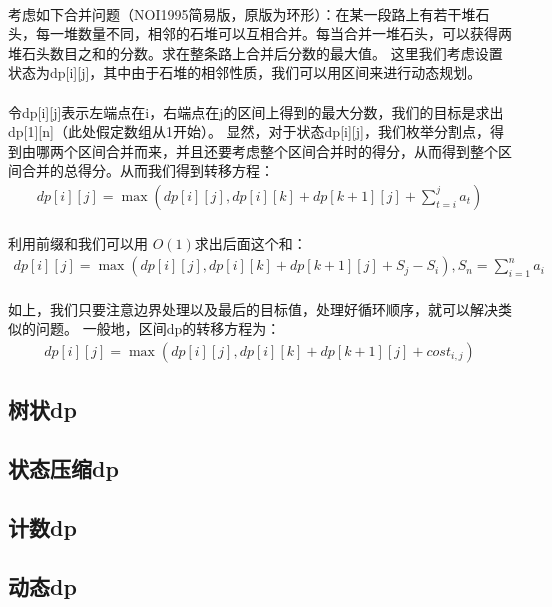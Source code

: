 \documentclass[12pt,a4paper,UTF16]{ctexbook}
\theoremstyle{plain}
\begin{document}
\paragraph{}考虑如下合并问题（NOI1995简易版，原版为环形）：在某一段路上有若干堆石头，每一堆数量不同，相邻的石堆可以互相合并。每当合并一堆石头，可以获得两堆石头数目之和的分数。求在整条路上合并后分数的最大值。
这里我们考虑设置状态为dp[i][j]，其中由于石堆的相邻性质，我们可以用区间来进行动态规划。
\paragraph{}令dp[i][j]表示左端点在i，右端点在j的区间上得到的最大分数，我们的目标是求出dp[1][n]（此处假定数组从1开始）。
显然，对于状态dp[i][j]，我们枚举分割点，得到由哪两个区间合并而来，并且还要考虑整个区间合并时的得分，从而得到整个区间合并的总得分。从而我们得到转移方程：
\begin{align*}
  dp[i][j]=\max (dp[i][j],dp[i][k]+dp[k+1][j]+\sum_{t=i}^j a_t)
\end{align*}
\paragraph{}
利用前缀和我们可以用 $O(1)
$求出后面这个和：
\begin{align*}
  dp[i][j]=\max (dp[i][j],dp[i][k]+dp[k+1][j]+S_j-S_i),S_n=\sum_{i=1}^n a_i
\end{align*}
\paragraph{}
如上，我们只要注意边界处理以及最后的目标值，处理好循环顺序，就可以解决类似的问题。
一般地，区间dp的转移方程为：
\begin{align*}
  dp[i][j]=\max (dp[i][j],dp[i][k]+dp[k+1][j]+cost_{i,j})
\end{align*}
\subsection{树状dp}
\subsection{状态压缩dp}
\subsection{计数dp}
\subsection{动态dp}
\end{document}
